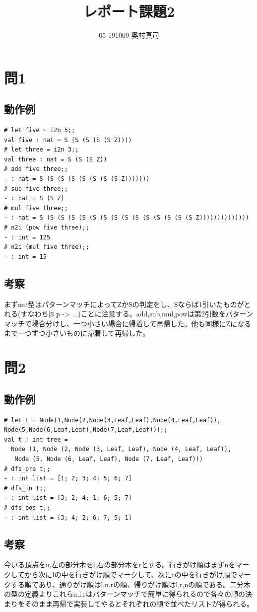\documentclass[11pt,a4paper]{jsarticle}
\title{レポート課題2}
\author{05-191009 奥村真司}
\date{}
\begin{document}
\maketitle
%
%
\section*{問1}
\subsection*{動作例}
\begin{lstlisting}[basicstyle=\ttfamily\footnotesize, frame=single]
# let five = i2n 5;;
val five : nat = S (S (S (S (S Z))))
# let three = i2n 3;;
val three : nat = S (S (S Z))
# add five three;;
- : nat = S (S (S (S (S (S (S (S Z)))))))
# sub five three;;
- : nat = S (S Z)
# mul five three;;
- : nat = S (S (S (S (S (S (S (S (S (S (S (S (S (S (S Z))))))))))))))
# n2i (pow five three);;
- : int = 125
# n2i (mul five three);;
- : int = 15
\end{lstlisting}
\subsection*{考察}
まずnat型はパターンマッチによってZかSの判定をし、Sならば1引いたものがとれる(すなわち$\texttt{|S p -> ...}$)ことに注意する。add,sub,mul,powは第2引数をパターンマッチで場合分けし、一つ小さい場合に帰着して再帰した。他も同様にZになるまで一つずつ小さいものに帰着して再帰した。
\section*{問2}
\subsection*{動作例}
\begin{lstlisting}[basicstyle=\ttfamily\footnotesize, frame=single]
# let t = Node(1,Node(2,Node(3,Leaf,Leaf),Node(4,Leaf,Leaf)),
Node(5,Node(6,Leaf,Leaf),Node(7,Leaf,Leaf)));;
val t : int tree =
  Node (1, Node (2, Node (3, Leaf, Leaf), Node (4, Leaf, Leaf)),
   Node (5, Node (6, Leaf, Leaf), Node (7, Leaf, Leaf)))
# dfs_pre t;;
- : int list = [1; 2; 3; 4; 5; 6; 7]
# dfs_in t;;
- : int list = [3; 2; 4; 1; 6; 5; 7]
# dfs_pos t;;
- : int list = [3; 4; 2; 6; 7; 5; 1]
\end{lstlisting}
\subsection*{考察}
今いる頂点をn,左の部分木をl,右の部分木をrとする。行きがけ順はまずnをマークしてから次にlの中を行きがけ順でマークして、次にrの中を行きがけ順でマークする順であり、通りがけ順はl,n,rの順、帰りがけ順はl,r,nの順である。二分木の型の定義よりこれらn,l,rはパターンマッチで簡単に得られるので各々の順の決まりをそのまま再帰で実装してやるとそれぞれの順で並べたリストが得られる。
\end{document}
